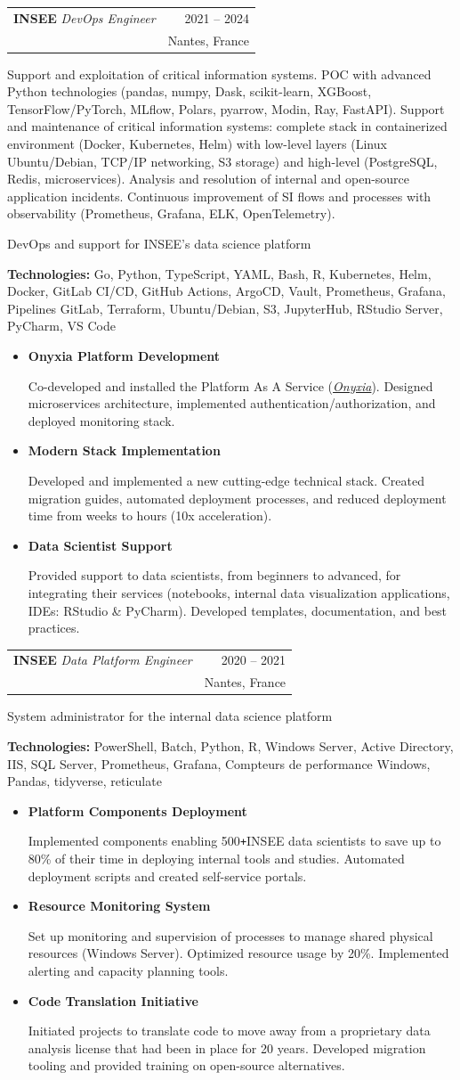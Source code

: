 \documentclass[a4paper,10pt]{article}
\makeatletter
\newlength{\spaceJobTech}\setlength{\spaceJobTech}{2pt}
\newlength{\spaceProjectList}\setlength{\spaceProjectList}{3pt}
\newlength{\spaceJobMission}\setlength{\spaceJobMission}{3pt}
\newcommand{\resumeSubheading}[4]{
  \vspace{1pt}
  \small
  \item
    \begin{tabular*}{0.97\textwidth}[t]{l @{\extracolsep{\fill}}r}
      \normalsize{\textbf{#1} \textit{#3}} & #4 \\
      & #2 \\
    \end{tabular*}
}
\def\Plus{\texttt{+\space}}
\newcommand{\resumeProjectListStart}{\begin{minipage}{0.97\textwidth} 
                                     \begin{itemize}[leftmargin=5mm]
                                     \vspace{\spaceProjectList}}
\newcommand{\resumeProjectListEnd}{\end{itemize} 
                                   \end{minipage}}
\newcommand{\resumeJobTechnologies}[1]{
    \vspace{\spaceJobTech}
    \small{\textbf{Technologies: } #1}\vspace{\spaceJobTech}
}
\newcommand{\resumeJobMission}[2]{
    \item\small{
        \textbf{#1} \\ 
        \begin{minipage}{0.95\textwidth}
            \small{#2}
        \end{minipage}
    }
    \vspace{\spaceJobMission}
}
\makeatother
\begin{document}
\resumeSubheading{INSEE}{Nantes, France}{DevOps Engineer}{2021 -- 2024}

Support and exploitation of critical information systems. POC with advanced Python technologies (pandas, numpy, Dask, scikit-learn, XGBoost, TensorFlow/PyTorch, MLflow, Polars, pyarrow, Modin, Ray, FastAPI). Support and maintenance of critical information systems: complete stack in containerized environment (Docker, Kubernetes, Helm) with low-level layers (Linux Ubuntu/Debian, TCP/IP networking, S3 storage) and high-level (PostgreSQL, Redis, microservices). Analysis and resolution of internal and open-source application incidents. Continuous improvement of SI flows and processes with observability (Prometheus, Grafana, ELK, OpenTelemetry).

DevOps and support for INSEE's data science platform
\resumeJobTechnologies{Go, Python, TypeScript, YAML, Bash, R, Kubernetes, Helm, Docker, GitLab CI/CD, GitHub Actions, ArgoCD, Vault, Prometheus, Grafana, Pipelines GitLab, Terraform, Ubuntu/Debian, S3, JupyterHub, RStudio Server, PyCharm, VS Code}
\resumeProjectListStart

\resumeJobMission    {Onyxia Platform Development}    {Co-developed and installed the Platform As A Service (\href{https://github.com/InseeFrLab/onyxia}{\textit{Onyxia}}). Designed microservices architecture, implemented authentication/authorization, and deployed monitoring stack.}
\resumeJobMission    {Modern Stack Implementation}    {Developed and implemented a new cutting-edge technical stack. Created migration guides, automated deployment processes, and reduced deployment time from weeks to hours (10x acceleration).}
\resumeJobMission    {Data Scientist Support}    {Provided support to data scientists, from beginners to advanced, for integrating their services (notebooks, internal data visualization applications, IDEs: RStudio \& PyCharm). Developed templates, documentation, and best practices.}
\resumeProjectListEnd

\resumeSubheading{INSEE}{Nantes, France}{Data Platform Engineer}{2020 -- 2021}

System administrator for the internal data science platform
\resumeJobTechnologies{PowerShell, Batch, Python, R, Windows Server, Active Directory, IIS, SQL Server, Prometheus, Grafana, Compteurs de performance Windows, Pandas, tidyverse, reticulate}
\resumeProjectListStart

\resumeJobMission    {Platform Components Deployment}    {Implemented components enabling 500\Plus INSEE data scientists to save up to 80\% of their time in deploying internal tools and studies. Automated deployment scripts and created self-service portals.}
\resumeJobMission    {Resource Monitoring System}    {Set up monitoring and supervision of processes to manage shared physical resources (Windows Server). Optimized resource usage by 20\%. Implemented alerting and capacity planning tools.}
\resumeJobMission    {Code Translation Initiative}    {Initiated projects to translate code to move away from a proprietary data analysis license that had been in place for 20 years. Developed migration tooling and provided training on open-source alternatives.}
\resumeProjectListEnd
\end{document}
